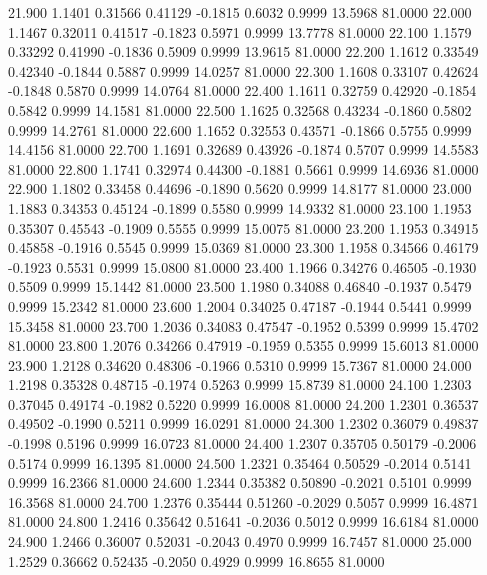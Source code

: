   21.900   1.1401   0.31566   0.41129  -0.1815   0.6032   0.9999  13.5968  81.0000
  22.000   1.1467   0.32011   0.41517  -0.1823   0.5971   0.9999  13.7778  81.0000
  22.100   1.1579   0.33292   0.41990  -0.1836   0.5909   0.9999  13.9615  81.0000
  22.200   1.1612   0.33549   0.42340  -0.1844   0.5887   0.9999  14.0257  81.0000
  22.300   1.1608   0.33107   0.42624  -0.1848   0.5870   0.9999  14.0764  81.0000
  22.400   1.1611   0.32759   0.42920  -0.1854   0.5842   0.9999  14.1581  81.0000
  22.500   1.1625   0.32568   0.43234  -0.1860   0.5802   0.9999  14.2761  81.0000
  22.600   1.1652   0.32553   0.43571  -0.1866   0.5755   0.9999  14.4156  81.0000
  22.700   1.1691   0.32689   0.43926  -0.1874   0.5707   0.9999  14.5583  81.0000
  22.800   1.1741   0.32974   0.44300  -0.1881   0.5661   0.9999  14.6936  81.0000
  22.900   1.1802   0.33458   0.44696  -0.1890   0.5620   0.9999  14.8177  81.0000
  23.000   1.1883   0.34353   0.45124  -0.1899   0.5580   0.9999  14.9332  81.0000
  23.100   1.1953   0.35307   0.45543  -0.1909   0.5555   0.9999  15.0075  81.0000
  23.200   1.1953   0.34915   0.45858  -0.1916   0.5545   0.9999  15.0369  81.0000
  23.300   1.1958   0.34566   0.46179  -0.1923   0.5531   0.9999  15.0800  81.0000
  23.400   1.1966   0.34276   0.46505  -0.1930   0.5509   0.9999  15.1442  81.0000
  23.500   1.1980   0.34088   0.46840  -0.1937   0.5479   0.9999  15.2342  81.0000
  23.600   1.2004   0.34025   0.47187  -0.1944   0.5441   0.9999  15.3458  81.0000
  23.700   1.2036   0.34083   0.47547  -0.1952   0.5399   0.9999  15.4702  81.0000
  23.800   1.2076   0.34266   0.47919  -0.1959   0.5355   0.9999  15.6013  81.0000
  23.900   1.2128   0.34620   0.48306  -0.1966   0.5310   0.9999  15.7367  81.0000
  24.000   1.2198   0.35328   0.48715  -0.1974   0.5263   0.9999  15.8739  81.0000
  24.100   1.2303   0.37045   0.49174  -0.1982   0.5220   0.9999  16.0008  81.0000
  24.200   1.2301   0.36537   0.49502  -0.1990   0.5211   0.9999  16.0291  81.0000
  24.300   1.2302   0.36079   0.49837  -0.1998   0.5196   0.9999  16.0723  81.0000
  24.400   1.2307   0.35705   0.50179  -0.2006   0.5174   0.9999  16.1395  81.0000
  24.500   1.2321   0.35464   0.50529  -0.2014   0.5141   0.9999  16.2366  81.0000
  24.600   1.2344   0.35382   0.50890  -0.2021   0.5101   0.9999  16.3568  81.0000
  24.700   1.2376   0.35444   0.51260  -0.2029   0.5057   0.9999  16.4871  81.0000
  24.800   1.2416   0.35642   0.51641  -0.2036   0.5012   0.9999  16.6184  81.0000
  24.900   1.2466   0.36007   0.52031  -0.2043   0.4970   0.9999  16.7457  81.0000
  25.000   1.2529   0.36662   0.52435  -0.2050   0.4929   0.9999  16.8655  81.0000
